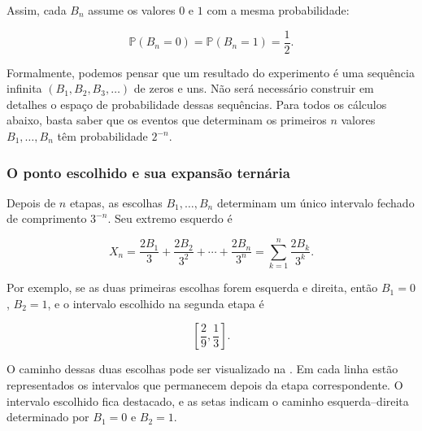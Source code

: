 \documentclass[12pt,portuguese]{article}
\theoremstyle{definition}
\theoremstyle{plainexercise}
\theoremstyle{starredexercise}
\theoremstyle{definition}
\begin{document}
Assim, cada $B_n$ assume os valores $0$ e $1$ com a mesma probabilidade:

\[
  \mathbb{P}(B_n=0)=\mathbb{P}(B_n=1)=\frac{1}{2}.
\]

Formalmente, podemos pensar que um resultado do experimento é uma sequência
infinita $(B_1,B_2,B_3,\ldots)$ de zeros e uns. Não será necessário construir
em detalhes o espaço de probabilidade dessas sequências. Para todos os
cálculos abaixo, basta saber que os eventos que determinam os primeiros $n$ valores
$B_1,\ldots,B_n$ têm probabilidade $2^{-n}$.

\subsubsection{O ponto escolhido e sua expansão ternária}

Depois de $n$ etapas, as escolhas $B_1,\ldots,B_n$ determinam um único
intervalo fechado de comprimento $3^{-n}$. Seu extremo esquerdo é

\[
  X_n=\frac{2B_1}{3}+\frac{2B_2}{3^2}+\cdots+\frac{2B_n}{3^n}
  =\sum_{k=1}^{n}\frac{2B_k}{3^k}.
\]

Por exemplo, se as duas primeiras escolhas forem esquerda e direita, então
$B_1=0$, $B_2=1$, e o intervalo escolhido na segunda etapa é

\[
  \left[\frac{2}{9},\frac{1}{3}\right].
\]

O caminho dessas duas escolhas pode ser visualizado na
. Em cada
linha estão representados os intervalos que permanecem depois da etapa
correspondente. O intervalo escolhido fica destacado, e as setas
indicam o caminho esquerda--direita determinado por $B_1=0$ e $B_2=1$.
\end{document}
